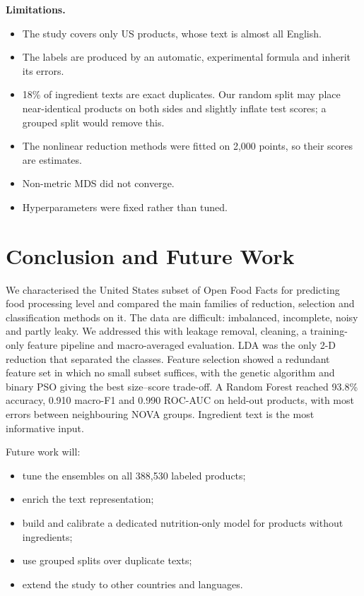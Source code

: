 \documentclass[conference]{IEEEtran}
\begin{document}
\textbf{Limitations.}
\begin{itemize}
    \item The study covers only US products, whose text is almost all English.
    \item The labels are produced by an automatic, experimental formula and inherit its errors.
    \item 18\% of ingredient texts are exact duplicates. Our random split may place near-identical products on both sides and slightly inflate test scores; a grouped split would remove this.
    \item The nonlinear reduction methods were fitted on 2,000 points, so their scores are estimates.
    \item Non-metric MDS did not converge.
    \item Hyperparameters were fixed rather than tuned.
\end{itemize}

\section{Conclusion and Future Work}
\label{sec:conclusion}

We characterised the United States subset of Open Food Facts for predicting food processing level and compared the main families of reduction, selection and classification methods on it. The data are difficult: imbalanced, incomplete, noisy and partly leaky. We addressed this with leakage removal, cleaning, a training-only feature pipeline and macro-averaged evaluation. LDA was the only 2-D reduction that separated the classes. Feature selection showed a redundant feature set in which no small subset suffices, with the genetic algorithm and binary PSO giving the best size--score trade-off. A Random Forest reached 93.8\% accuracy, 0.910 macro-F1 and 0.990 ROC-AUC on held-out products, with most errors between neighbouring NOVA groups. Ingredient text is the most informative input.

Future work will:
\begin{itemize}
    \item tune the ensembles on all 388,530 labeled products;
    \item enrich the text representation;
    \item build and calibrate a dedicated nutrition-only model for products without ingredients;
    \item use grouped splits over duplicate texts;
    \item extend the study to other countries and languages.
\end{itemize}
\end{document}
